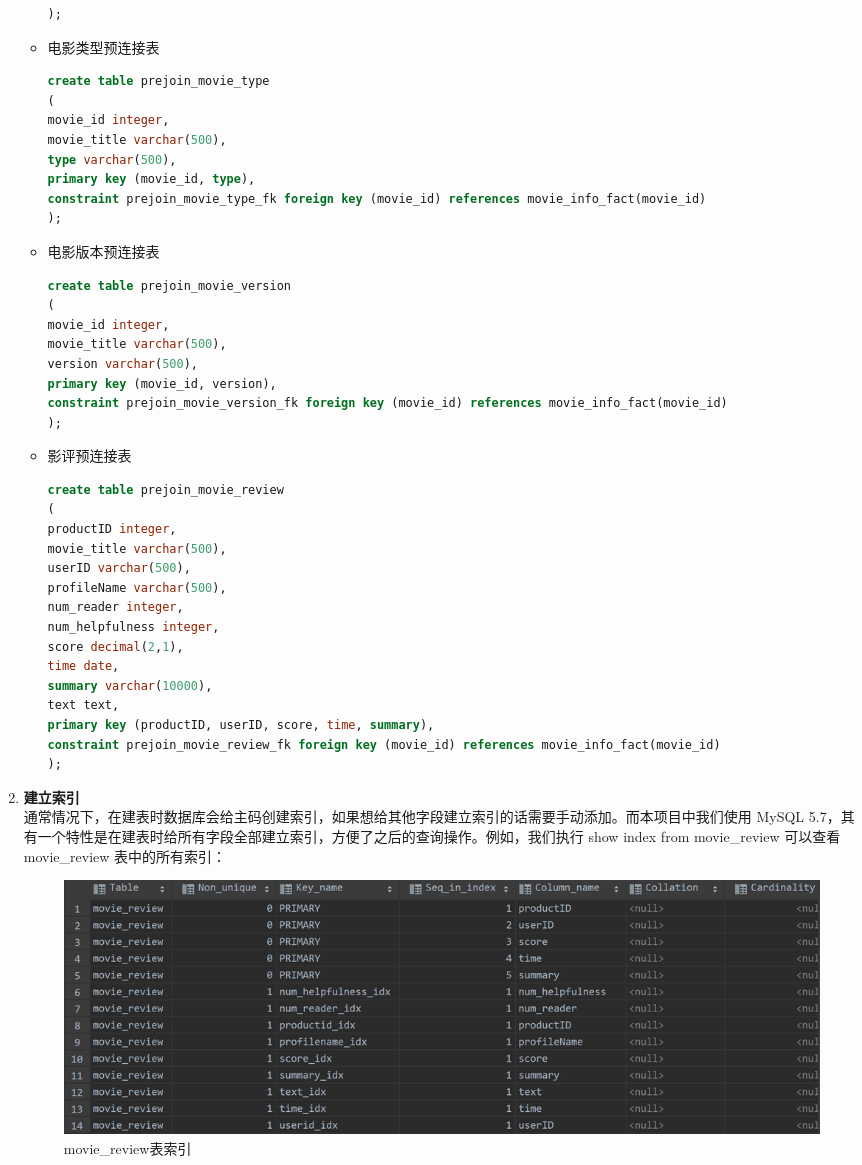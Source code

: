 \documentclass{ctexrep}
\begin{document}
\begin{enumerate}
\begin{itemize}
\begin{lstlisting}[language=sql]
);
                \end{lstlisting}
            \item 电影类型预连接表
                \begin{lstlisting}[language=sql]
create table prejoin_movie_type
(
movie_id integer,
movie_title varchar(500),
type varchar(500),
primary key (movie_id, type),
constraint prejoin_movie_type_fk foreign key (movie_id) references movie_info_fact(movie_id)
);
                \end{lstlisting}
            \item 电影版本预连接表
                \begin{lstlisting}[language=sql]
create table prejoin_movie_version
(
movie_id integer,
movie_title varchar(500),
version varchar(500),
primary key (movie_id, version),
constraint prejoin_movie_version_fk foreign key (movie_id) references movie_info_fact(movie_id)
);
                \end{lstlisting}
            \item 影评预连接表
                \begin{lstlisting}[language=sql]
create table prejoin_movie_review
(
productID integer,
movie_title varchar(500),
userID varchar(500),
profileName varchar(500),
num_reader integer,
num_helpfulness integer,
score decimal(2,1),
time date,
summary varchar(10000),
text text,
primary key (productID, userID, score, time, summary),
constraint prejoin_movie_review_fk foreign key (movie_id) references movie_info_fact(movie_id)
);
                \end{lstlisting}
        \end{itemize}
        \item \textbf{建立索引}\\
        通常情况下，在建表时数据库会给主码创建索引，如果想给其他字段建立索引的话需要手动添加。而本项目中我们使用 MySQL 5.7，其有一个特性是在建表时给所有字段全部建立索引，方便了之后的查询操作。例如，我们执行 show index from movie\_review 可以查看 movie\_review 表中的所有索引：
        \begin{figure}[H]
    		\centering
    		\includegraphics[width=0.7\linewidth]{img/index.png}
    		\caption{movie\_review表索引}
    		\label{fig:MySQL_DB2}
    	\end{figure}
    \end{enumerate}
\end{document}
